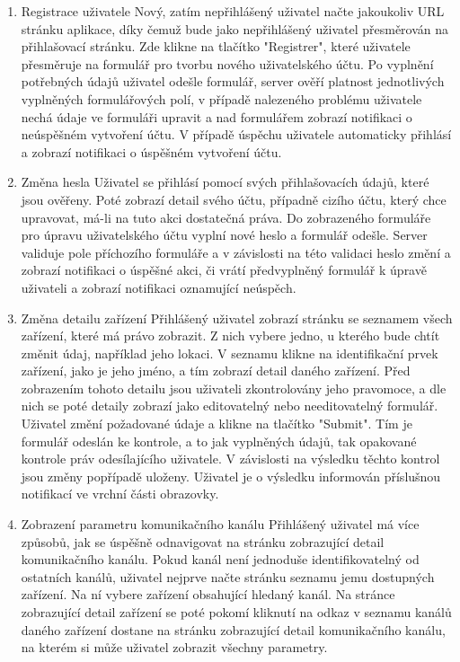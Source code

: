 { %
\renewcommand{\labelenumi}{UC\arabic{enumi}}
\begin{enumerate}
\item{Registrace uživatele} 
Nový, zatím nepřihlášený uživatel načte jakoukoliv URL stránku aplikace, díky čemuž bude jako nepřihlášený uživatel přesměrován na přihlašovací stránku. Zde klikne na tlačítko "Registrer", které uživatele přesměruje na formulář pro tvorbu nového uživatelského účtu. Po vyplnění potřebných údajů uživatel odešle formulář, server ověří platnost jednotlivých vyplněných formulářových polí, v případě nalezeného problému uživatele nechá údaje ve formuláři upravit a nad formulářem zobrazí notifikaci o neúspěšném vytvoření účtu. V případě úspěchu uživatele automaticky přihlásí a zobrazí notifikaci o úspěšném vytvoření účtu.
\item{Změna hesla}
Uživatel se přihlásí pomocí svých přihlašovacích údajů, které jsou ověřeny. Poté zobrazí detail svého účtu, případně cizího účtu, který chce upravovat, má-li na tuto akci dostatečná práva. Do zobrazeného formuláře pro úpravu uživatelského účtu vyplní nové heslo a formulář odešle. Server validuje pole příchozího formuláře a v závislosti na této validaci heslo změní a zobrazí notifikaci o úspěšné akci, či vrátí předvyplněný formulář k úpravě uživateli a zobrazí notifikaci oznamující neúspěch.
\item{Změna detailu zařízení}
Přihlášený uživatel zobrazí stránku se seznamem všech zařízení, které má právo zobrazit. Z nich vybere jedno, u kterého bude chtít změnit údaj, například jeho lokaci. V seznamu klikne na identifikační prvek zařízení, jako je jeho jméno, a tím zobrazí detail daného zařízení. Před zobrazením tohoto detailu jsou uživateli zkontrolovány jeho pravomoce, a dle nich se poté detaily zobrazí jako editovatelný nebo needitovatelný formulář. Uživatel změní požadované údaje a klikne na tlačítko "Submit". Tím je formulář odeslán ke kontrole, a to jak vyplněných údajů, tak opakované kontrole práv odesílajícího uživatele. V závislosti na výsledku těchto kontrol jsou změny popřípadě uloženy. Uživatel je o výsledku informován příslušnou notifikací ve vrchní části obrazovky.
\item{Zobrazení parametru komunikačního kanálu}
Přihlášený uživatel má více způsobů, jak se úspěšně odnavigovat na stránku zobrazující detail komunikačního kanálu. Pokud kanál není jednoduše identifikovatelný od ostatních kanálů, uživatel nejprve načte stránku seznamu jemu dostupných zařízení. Na ní vybere zařízení obsahující hledaný kanál. Na stránce zobrazující detail zařízení se poté pokomí kliknutí na odkaz v seznamu kanálů daného zařízení dostane na stránku zobrazující detail komunikačního kanálu, na kterém si může uživatel zobrazit všechny parametry.

\end{enumerate}}
